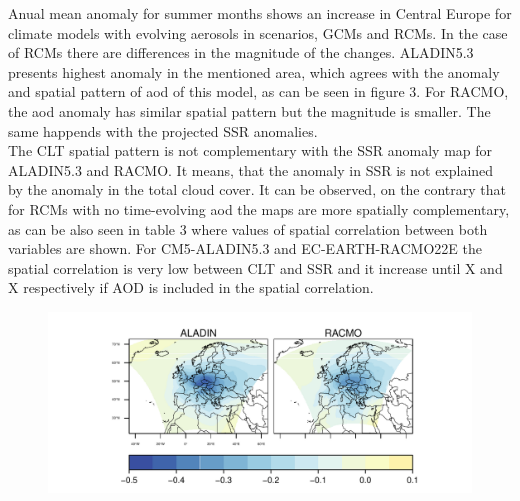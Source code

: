 Anual mean anomaly for summer months shows an increase in Central Europe for climate models with evolving aerosols in scenarios, GCMs and RCMs. In the case of RCMs there are differences in the magnitude of the changes. ALADIN5.3 presents highest anomaly in the mentioned area, which agrees with the anomaly and spatial pattern of aod of this model, as can be seen in figure 3. For RACMO, the aod anomaly has similar spatial pattern but the magnitude is smaller. The same happends with the projected SSR anomalies.\\

The CLT spatial pattern is not complementary with the SSR anomaly map for ALADIN5.3 and RACMO. It means, that the anomaly in SSR is not explained by the anomaly in the total cloud cover. It can be observed, on the contrary that for RCMs with no time-evolving aod the maps are more spatially complementary, as can be also seen in table 3 where values of spatial correlation between both variables are shown. For CM5-ALADIN5.3 and EC-EARTH-RACMO22E the spatial correlation is very low between CLT and SSR and it increase until X and X respectively if AOD is included in the spatial correlation.\\

\begin{figure}[h!]
\centering\includegraphics[width=1\textwidth]{figs/capitulo7/ANOMALIAS_JJA_AOD_2050-2021.pdf}
\caption{}
\label{}
\end{figure}

